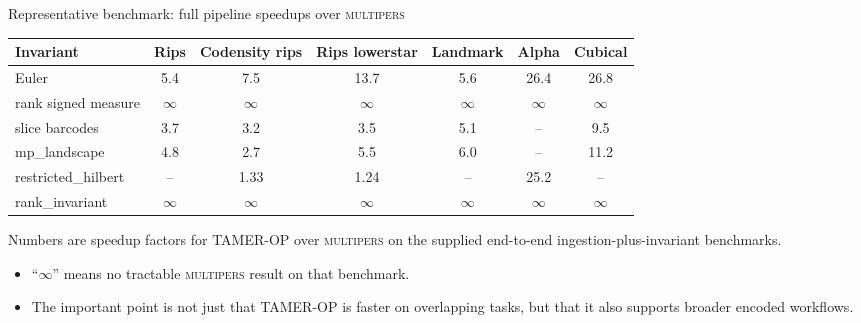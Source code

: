 \documentclass[aspectratio=169,11pt]{beamer}
\newcommand{\TAMER}{\textsc{TAMER-OP}}
\newcommand{\multipers}{\textsc{multipers}}
\begin{document}
\begin{frame}{Representative benchmark: full pipeline speedups over \multipers}
\small
\centering
\begin{tabular}{lcccccc}
\toprule
Invariant & Rips & Codensity rips & Rips lowerstar & Landmark & Alpha & Cubical \\
\midrule
Euler & 5.4 & 7.5 & 13.7 & 5.6 & 26.4 & 26.8 \\
rank signed measure & $\infty$ & $\infty$ & $\infty$ & $\infty$ & $\infty$ & $\infty$ \\
slice barcodes & 3.7 & 3.2 & 3.5 & 5.1 & -- & 9.5 \\
mp\_landscape & 4.8 & 2.7 & 5.5 & 6.0 & -- & 11.2 \\
restricted\_hilbert & -- & 1.33 & 1.24 & -- & 25.2 & -- \\
rank\_invariant & $\infty$ & $\infty$ & $\infty$ & $\infty$ & $\infty$ & $\infty$ \\
\bottomrule
\end{tabular}

\medskip
\raggedright
Numbers are speedup factors for \TAMER{} over \multipers{} on the supplied end-to-end ingestion-plus-invariant benchmarks.

\medskip
\begin{itemize}
  \item ``$\infty$'' means no tractable \multipers{} result on that benchmark.
  \item The important point is not just that \TAMER{} is faster on overlapping tasks, but that it also supports broader encoded workflows.
\end{itemize}
\end{frame}
\end{document}
